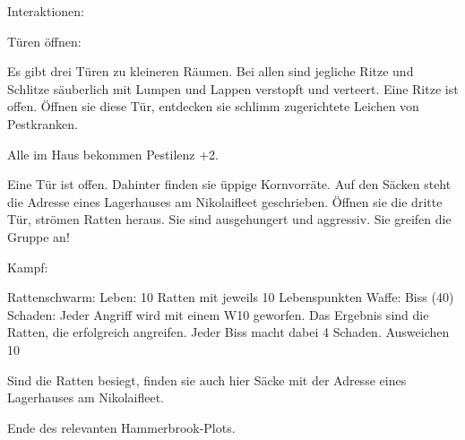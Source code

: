 Interaktionen:

Türen öffnen:

Es gibt drei Türen zu kleineren Räumen. Bei allen sind jegliche Ritze und Schlitze säuberlich mit Lumpen und Lappen verstopft und verteert. Eine Ritze ist offen.
Öffnen sie diese Tür, entdecken sie schlimm zugerichtete Leichen von Pestkranken.

Alle im Haus bekommen Pestilenz +2.

Eine Tür ist offen. Dahinter finden sie üppige Kornvorräte. Auf den Säcken steht die Adresse eines Lagerhauses am Nikolaifleet geschrieben.
Öffnen sie die dritte Tür, strömen Ratten heraus. Sie sind ausgehungert und aggressiv. Sie greifen die Gruppe an!

Kampf:

Rattenschwarm:
Leben: 10 Ratten mit jeweils 10 Lebenspunkten
Waffe: Biss (40)
Schaden: Jeder Angriff wird mit einem W10 geworfen. Das Ergebnis sind die Ratten, die erfolgreich angreifen. Jeder Biss macht dabei 4 Schaden.
Ausweichen 10

Sind die Ratten besiegt, finden sie auch hier Säcke mit der Adresse eines Lagerhauses am Nikolaifleet.

Ende des relevanten Hammerbrook-Plots.
